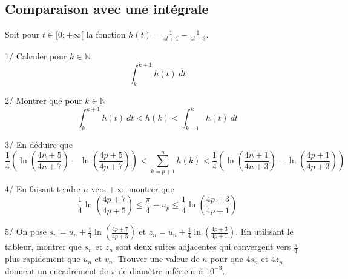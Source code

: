 \documentclass[a4paper,11pt]{book}
\begin{document}
\subsection{Comparaison avec une int\'egrale}
Soit pour $t \in [0;+\infty[$ la fonction $\displaystyle h(t)=\frac{1}{4t+1}-\frac{1}{4t+3}$.

1/ Calculer pour $k\in \mathbb{N}$
$$\int_k^{k+1} h(t) \ dt$$
 
2/ Montrer que pour $k\in \mathbb{N}$
$$\int_k^{k+1} h(t)\ dt<h(k)<\int_{k-1}^k h(t)\ dt$$

3/ En d\'eduire que
$$\frac{1}{4}(\ln(\frac{4n+5}{4n+7})-\ln(\frac{4p+5}{4p+7}))<\sum_{k=p+1}^n h(k)<\frac{1}{4}(\ln(\frac{4n+1}{4n+3})-\ln(\frac{4p+1}{4p+3}))$$
 
4/ En faisant tendre $n$ vers $+\infty$, montrer que 
$$\frac{1}{4}\ln(\frac{4p+7}{4p+5})\leq \frac{\pi}{4}-u_p\leq\frac{1}{4}\ln(\frac{4p+3}{4p+1})$$

5/ On pose $\displaystyle s_n=u_n+\frac{1}{4}\ln(\frac{4p+7}{4p+5})$ et $\displaystyle z_n=u_n+\frac{1}{4}\ln(\frac{4p+3}{4p+1})$.
En utilisant le tableur, montrer que $s_n$ et $z_n$ sont deux suites adjacentes qui convergent vers $\displaystyle \frac{\pi}{4}$ plus rapidement que $u_n$ et $v_n$.
Trouver une valeur de $n$ pour que $4s_n$ et $4z_n$ donnent un encadrement de $\pi$ de diam\`etre inf\'erieur \`a $10^{-3}$.

\end{document}
